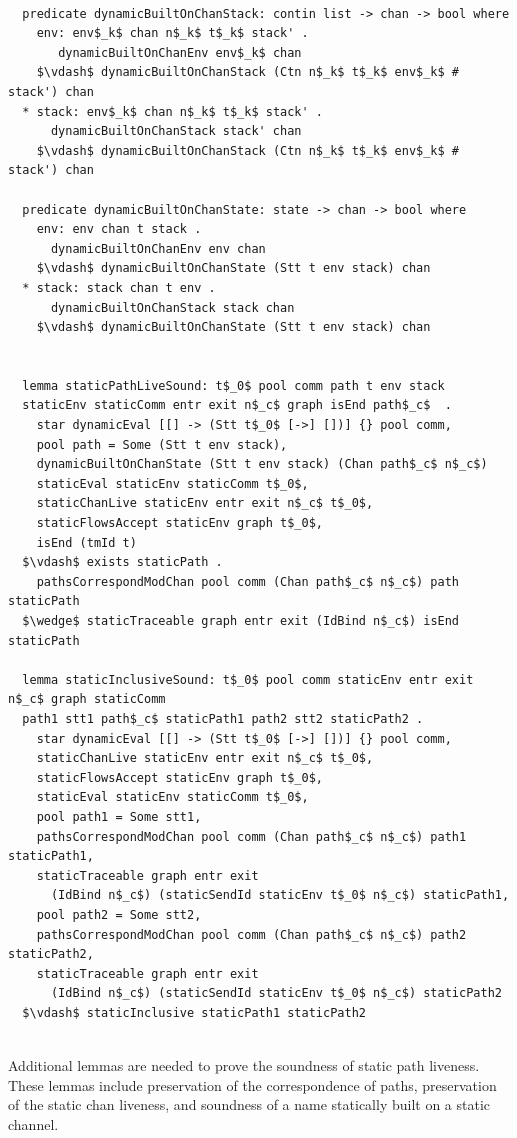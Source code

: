 \documentclass[letterpaper, 11pt]{report}
\begin{document}
\begin{lstlisting}[language=logic, mathescape]

  predicate dynamicBuiltOnChanStack: contin list -> chan -> bool where
    env: env$_k$ chan n$_k$ t$_k$ stack' .
       dynamicBuiltOnChanEnv env$_k$ chan
    $\vdash$ dynamicBuiltOnChanStack (Ctn n$_k$ t$_k$ env$_k$ # stack') chan
  * stack: env$_k$ chan n$_k$ t$_k$ stack' .
      dynamicBuiltOnChanStack stack' chan
    $\vdash$ dynamicBuiltOnChanStack (Ctn n$_k$ t$_k$ env$_k$ # stack') chan
  
  predicate dynamicBuiltOnChanState: state -> chan -> bool where
    env: env chan t stack . 
      dynamicBuiltOnChanEnv env chan
    $\vdash$ dynamicBuiltOnChanState (Stt t env stack) chan
  * stack: stack chan t env .
      dynamicBuiltOnChanStack stack chan
    $\vdash$ dynamicBuiltOnChanState (Stt t env stack) chan


  lemma staticPathLiveSound: t$_0$ pool comm path t env stack
  staticEnv staticComm entr exit n$_c$ graph isEnd path$_c$  . 
    star dynamicEval [[] -> (Stt t$_0$ [->] [])] {} pool comm,
    pool path = Some (Stt t env stack),
    dynamicBuiltOnChanState (Stt t env stack) (Chan path$_c$ n$_c$)
    staticEval staticEnv staticComm t$_0$,
    staticChanLive staticEnv entr exit n$_c$ t$_0$,
    staticFlowsAccept staticEnv graph t$_0$, 
    isEnd (tmId t)
  $\vdash$ exists staticPath . 
    pathsCorrespondModChan pool comm (Chan path$_c$ n$_c$) path staticPath
  $\wedge$ staticTraceable graph entr exit (IdBind n$_c$) isEnd staticPath

  lemma staticInclusiveSound: t$_0$ pool comm staticEnv entr exit n$_c$ graph staticComm
  path1 stt1 path$_c$ staticPath1 path2 stt2 staticPath2 .
    star dynamicEval [[] -> (Stt t$_0$ [->] [])] {} pool comm, 
    staticChanLive staticEnv entr exit n$_c$ t$_0$, 
    staticFlowsAccept staticEnv graph t$_0$, 
    staticEval staticEnv staticComm t$_0$, 
    pool path1 = Some stt1, 
    pathsCorrespondModChan pool comm (Chan path$_c$ n$_c$) path1 staticPath1, 
    staticTraceable graph entr exit
      (IdBind n$_c$) (staticSendId staticEnv t$_0$ n$_c$) staticPath1, 
    pool path2 = Some stt2, 
    pathsCorrespondModChan pool comm (Chan path$_c$ n$_c$) path2 staticPath2, 
    staticTraceable graph entr exit
      (IdBind n$_c$) (staticSendId staticEnv t$_0$ n$_c$) staticPath2
  $\vdash$ staticInclusive staticPath1 staticPath2


\end{lstlisting}

Additional lemmas are needed to prove the soundness of static path liveness.
These lemmas include preservation of the correspondence of paths,
preservation of the static chan liveness,
and soundness of a name statically built on a static channel.
\end{document}
